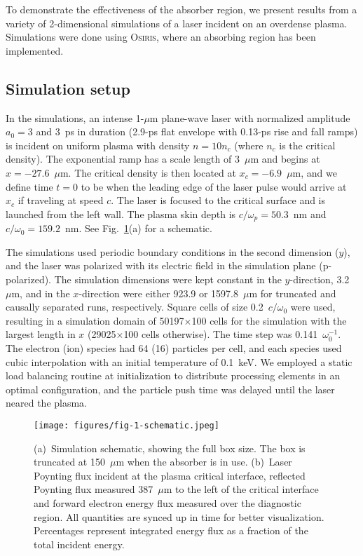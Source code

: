 \documentclass[../absorber.tex]{subfiles}
\begin{document}
To demonstrate the effectiveness of the absorber region, we present results from a variety of 2-dimensional simulations of a laser incident on an overdense plasma.  Simulations were done using \textsc{Osiris},\cite{Fonseca2002} where an absorbing region has been implemented.

\subsection{Simulation setup}
In the simulations, an intense 1-$\mu$m plane-wave laser with normalized amplitude $a_0=3$ and 3~ps in duration (2.9-ps flat envelope with 0.13-ps rise and fall ramps) is incident on uniform plasma with density $n=10n_c$ (where $n_c$ is the critical density).  The exponential ramp has a scale length of 3~$\mu$m and begins at $x=-27.6$~$\mu$m.  The critical density is then located at $x_c=-6.9$~$\mu$m, and we define time $t=0$ to be when the leading edge of the laser pulse would arrive at $x_c$ if traveling at speed $c$. The laser is focused to the critical surface and is launched from the left wall.  The plasma skin depth is $c/\omega_p = 50.3$~nm and $c/\omega_0 = 159.2$~nm.  See Fig.~\ref{fig:laser}(a) for a schematic.

The simulations used periodic boundary conditions in the second dimension ($y$), and the laser was polarized with its electric field in the simulation plane (p-polarized). The simulation dimensions were kept constant in the $y$-direction,  3.2~$\mu$m, and in the $x$-direction were either 923.9 or 1597.8~$\mu$m for truncated and causally separated runs, respectively.  Square cells of size 0.2~$c/\omega_0$ were used, resulting in a simulation domain of 50197$\times$100 cells for the simulation with the largest length in $x$ (29025$\times$100 cells otherwise).  The time step was 0.141~$\omega_0^{-1}$.  The electron (ion) species had 64 (16) particles per cell, and each species used cubic interpolation with an initial temperature of 0.1~keV.  We employed a static load balancing routine\cite{Fonseca2013} at initialization to distribute processing elements in an optimal configuration, and the particle push time was delayed until the laser neared the plasma.

\begin{figure}
\texttt{[image: figures/fig-1-schematic.jpeg]}
\caption{\label{fig:laser} (a)~Simulation schematic, showing the full box size. The box is truncated at 150~$\mu$m when the absorber is in use. (b)~Laser Poynting flux incident at the plasma critical interface, reflected Poynting flux measured 387~$\mu$m to the left of the critical interface and forward electron energy flux measured over the diagnostic region.  All quantities are synced up in time for better visualization.  Percentages represent integrated energy flux as a fraction of the total incident energy.}
\end{figure}
\end{document}
